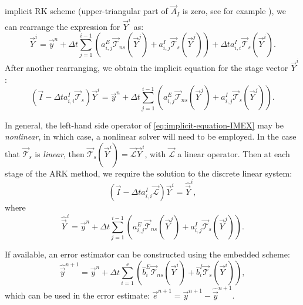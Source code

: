 \documentclass{article}
\begin{document}
implicit RK scheme (upper-triangular part of $\vec{A}_I$ is zero, see for example \cite{giraldo:2013}),
we can rearrange the expression for $\vec{Y}^i$ as:
\begin{equation}
	\vec{Y}^i = \vec{y}^n + \Delta t \sum_{j=1}^{i-1}\left(
	a^E_{i,j} \vec{\mathcal{T}}_{ns}(\vec{Y}^j) +
	a^I_{i,j} \vec{\mathcal{T}}_{s}(\vec{Y}^j)
	\right)
	+ \Delta t a^I_{i,i} \vec{\mathcal{T}}_{s}(\vec{Y}^i).
\end{equation}
After another rearranging, we obtain the implicit equation
for the stage vector $\vec{Y}^i$:
\begin{equation}\label{eq:implicit-equation-IMEX}
	\left( \vec{I} - \Delta t a_{i,i}^I \vec{\mathcal{T}}_{s}\right)\vec{Y}^i
	= \vec{y}^n + \Delta t \sum_{j=1}^{i-1}\left(
	a^E_{i,j} \vec{\mathcal{T}}_{ns}(\vec{Y}^j) +
	a^I_{i,j} \vec{\mathcal{T}}_{s}(\vec{Y}^j)
	\right).
\end{equation}

In general, the left-hand side operator of \eqref{eq:implicit-equation-IMEX}
may be \emph{nonlinear}, in which case, a nonlinear solver will need to be
employed. In the case that $\vec{\mathcal{T}}_{s}$ is \emph{linear},
then $\vec{\mathcal{T}}_{s}(\vec{Y}^i) = \vec{\mathcal{L}}\vec{Y}^i$, with
$\vec{\mathcal{L}}$ a linear operator. Then at each stage of the ARK method,
we require the solution to the discrete linear system:
\begin{equation}
	\left( \vec{I} - \Delta t a_{i,i}^I \vec{\mathcal{L}}\right)\vec{Y}^i =
	\widehat{\vec{Y}}^i,
\end{equation}
where
\begin{equation}
	\widehat{\vec{Y}}^i = \vec{y}^n + \Delta t \sum_{j=1}^{i-1}\left(
	a^E_{i,j} \vec{\mathcal{T}}_{ns}(\vec{Y}^j) +
	a^I_{i,j} \vec{\mathcal{T}}_{s}(\vec{Y}^j)
	\right).
\end{equation}

If available, an error estimator can be constructed using the embedded scheme:
\begin{equation}
	\widehat{\vec{y}}^{n+1} = \vec{y}^n + \Delta t \sum_{i=1}^{s}\left(
	\widehat{b}_i^E \vec{\mathcal{T}}_{ns}(\vec{Y}^i) + \widehat{b}_i^I \vec{\mathcal{T}}_{s}(\vec{Y}^i)
	\right),
\end{equation}
which can be used in the error estimate: $\vec{e}^{n+1} = \vec{y}^{n+1} - \widehat{\vec{y}}^{n+1}$.
\end{document}
